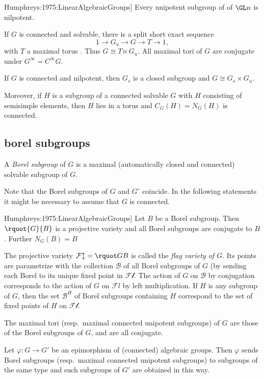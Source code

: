 \documentclass[english, no-theorem-numbers]{short-notes}
\newcommand\Humph[1]{\cite[#1]{Humphreys:1975:LinearAlgebraicGroups}}
\newcommand\conn{\circ}
\begin{document}
\begin{Thm}[\Humph{Cor.~17.5}]
    Every unipotent subgroup of of $\GL n$ is nilpotent.
\end{Thm}

If $G$ is connected and solvable, there is a split short exact sequence 
\[
    1 → G_u → G → T → 1,
\]
with $T$ a maximal torus \Humph{Thm.~19.3}. 
Thus $G \cong T ⋉ G_u$.
All maximal tori of $G$ are conjugate under $G^∞ = C^∞G$.

If $G$ is connected and nilpotent, then $G_s$ is a closed subgroup and $G \cong G_s × G_u$.

Moreover, if $H$ is a subgroup of a connected solvable $G$ with $H$ consisting of semisimple elements, then $H$ lies in a torus and $C_G(H) = N_G(H)$ is connected.

\subsection*{borel subgroups}

\begin{Def}
    A \emph{Borel subgroup} of $G$ is a maximal (automatically closed and connected) solvable subgroup of $G$.
\end{Def}

Note that the Borel subgroups of $G$ and $G^\conn$ coincide.
In the following statements it might be necessary to assume that $G$ is connected.

\begin{Thm}[\Humph{Thm.~21.3 and Thm.~23.1}]
    Let $B$ be a Borel subgroup.
    Then $\rquot{G}{B}$ is a projective variety and all Borel subgroups are conjugate to $B$.
    Further $N_G(B) = B$
\end{Thm}

The projective variety $\mathcal{Fl} = \rquot GB$ is called the \emph{flag variety of $G$}.
Its points are parametrize with the collection $\mathcal B$ of all Borel subgroups of $G$ (by sending each Borel to its unique fixed point in $\mathcal{Fl}$.
The action of $G$ on $\mathcal B$ by conjugation corresponds to the action of $G$ on $\mathcal Fl$ by left multiplication.
If $H$ is any subgroup of $G$, then the set $\mathcal B^H$ of Borel subgroups containing $H$ correspond to the set of fixed points of $H$ on $\mathcal{Fl}$.

The maximal tori (resp.~maximal connected unipotent subgroups) of $G$ are those of the Borel subgroups of $G$, and are all conjugate.

\begin{Prop}
    Let $φ\colon G → G'$ be an epimorphism of (connected) algebraic groups.
    Then $φ$ sends Borel subgroups (resp.~maximal connected unipotent subgroups) to subgroups of the same type and such subgroups of $G'$ are obtained in this way.
\end{Prop}
\end{document}
